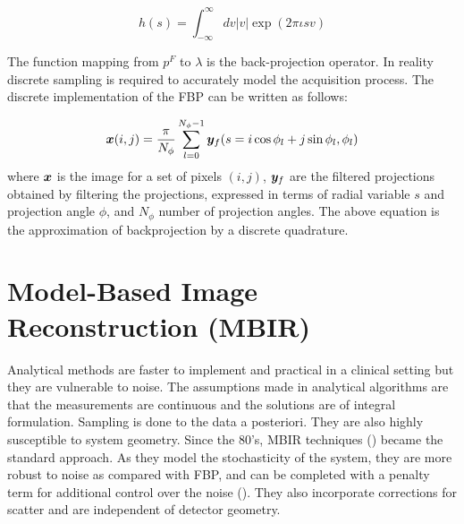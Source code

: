 \begin{equation}
h(s)=\int_{-\infty}^{\infty} d v|v| \exp (2 \pi \iota s v)
\end{equation}

The function mapping from $p^{F}$ to $\lambda$ is the back-projection operator. 
In reality discrete sampling is required to accurately model the acquisition process. The discrete implementation of the \ac{FBP} can be written as follows:

\begin{equation}\label{eq:FBP}
\bm{x}(i,j) = \frac{\pi}{N_\phi}\sum_{l=0}^{N_\phi-1}\bm{y}_f(s=i\cos\phi_l+j\sin\phi_l,\phi_l)
\end{equation}
where $\bm{x}$ is the image for a set of pixels $(i,j)$, $\bm{y}_f$ are the filtered projections obtained by filtering the projections, expressed in terms of radial variable $s$ and projection angle $\phi$, and $N_\phi$ number of projection angles. The above equation is the approximation of backprojection by a discrete quadrature. 




\section{Model-Based Image Reconstruction (MBIR)}

Analytical methods are faster to implement and practical in a clinical setting but they are vulnerable to noise. The assumptions made in analytical algorithms are that the measurements are continuous and the solutions are of integral formulation. Sampling is done to the data a posteriori. They are also highly susceptible to system geometry. Since the 80's, \ac{MBIR} techniques (\cite{Shepp1982,fessler2000statistical}) became the standard approach. As they model the stochasticity of the system, they are more robust to noise as compared with \ac{FBP}, and can be completed with a penalty term for additional control over the noise (\cite{depierro1995}). They also incorporate corrections for scatter and are independent of detector geometry.

